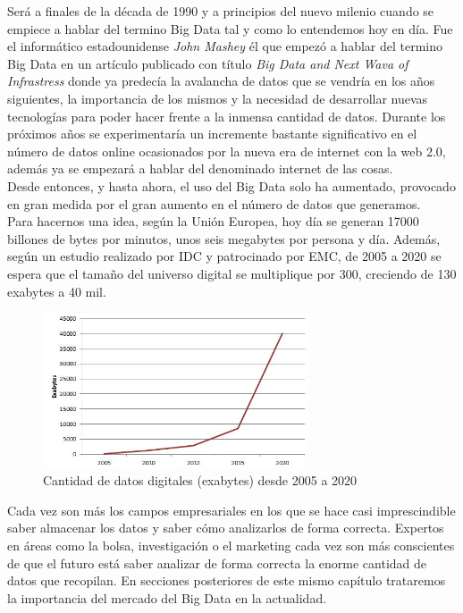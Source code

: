 Será a finales de la década de 1990 y a principios del nuevo milenio cuando se empiece a hablar  del termino Big Data tal y como lo entendemos hoy en día. Fue el informático estadounidense \emph{John Mashey} él que empezó a hablar del termino Big Data en un artículo publicado con título \emph{Big Data and Next Wava of Infrastress} donde ya predecía la avalancha de datos que se vendría en los años siguientes, la importancia de los mismos y la necesidad de desarrollar nuevas tecnologías para poder hacer frente a la inmensa cantidad de datos. Durante los próximos años se experimentaría un incremente bastante  significativo en el número de datos online ocasionados por la nueva era de internet con la web 2.0, además ya se empezará a hablar del denominado internet de las cosas.
\cite{John_Mashey}\\

Desde entonces, y hasta ahora, el uso del Big Data solo ha aumentado, provocado en gran medida por el gran aumento en el número  de datos que generamos.\\
Para hacernos una idea, según la Unión Europea, hoy día se generan 17000 billones de bytes por minutos, unos seis megabytes por persona y día. Además, según un estudio realizado por IDC y patrocinado por EMC, de 2005 a 2020 se espera que el tamaño del universo digital se multiplique por 300, creciendo de 130 exabytes a 40 mil.
\cite{IDC}\\

\begin{figure}[H]
	\centering
	\includegraphics[width=0.7\textwidth]{./imagenes/evolucion_datos}
	\caption{Cantidad de datos digitales (exabytes) desde 2005 a 2020\cite{IDC}} 
	
\end{figure}


Cada vez son más los campos empresariales en los que se hace casi imprescindible saber almacenar los datos y saber cómo analizarlos de forma correcta. Expertos en áreas como la bolsa, investigación o el marketing cada vez son más conscientes de que el futuro está saber analizar de forma correcta la enorme cantidad de datos que recopilan. En secciones posteriores de este mismo capítulo trataremos la importancia del mercado del Big Data en la actualidad.

